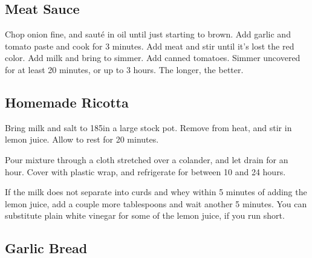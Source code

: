 \begin{recipe}
\subsection{Meat Sauce}



Chop onion fine, and sauté in oil until just starting to brown. Add garlic and tomato paste and cook for 3 minutes. Add meat and stir until it's lost the red color. Add milk and bring to simmer. Add canned tomatoes. Simmer uncovered for at least 20 minutes, or up to 3 hours. The longer, the better.

\subsection{Homemade Ricotta}


Bring milk and salt to 185\degree in a large stock pot. Remove from heat, and stir in lemon juice. Allow to rest for 20 minutes.

Pour mixture through a cloth stretched over a colander, and let drain for an hour. Cover with plastic wrap, and refrigerate for between 10 and 24 hours.

If the milk does not separate into curds and whey within 5 minutes of adding the lemon juice, add a couple more tablespoons and wait another 5 minutes. You can substitute plain white vinegar for some of the lemon juice, if you run short.

\subsection{Garlic Bread}


\end{recipe}
